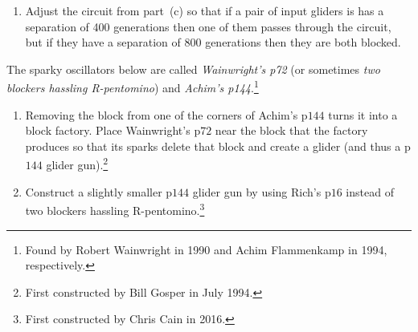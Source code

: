 \begin{multicols}{2}
\begin{problem}
\begin{enumerate}[label=\bf\color{ocre}(\alph*)]
			\item {} Adjust the circuit from part~(c) so that if a pair of input gliders is has a separation of 400 generations then one of them passes through the circuit, but if they have a separation of 800 generations then they are both blocked.
		\end{enumerate}
	\end{problem}
	
	
	\mfilbreak
	
	
	\begin{problem}\label{exer:p144_gun_from_achim} 
		The sparky oscillators below are called \emph{Wainwright's p72} (or sometimes \emph{two blockers hassling R-pentomino}) and \emph{Achim's p144}.\footnote{Found by Robert Wainwright in 1990 and Achim Flammenkamp in 1994, respectively.}
		\begin{center}
			 \quad {}
		\end{center}
		
		\begin{enumerate}[label=\bf\color{ocre}(\alph*)]
			\item Removing the block from one of the corners of Achim's p$144$ turns it into a block factory. Place Wainwright's p$72$ near the block that the factory produces so that its sparks delete that block and create a glider (and thus a p$144$ glider gun).\footnote{First constructed by Bill Gosper in July 1994.}
			
			\item Construct a slightly smaller p$144$ glider gun by using Rich's p$16$ instead of two blockers hassling R-pentomino.\footnote{First constructed by Chris Cain in 2016.}
		\end{enumerate}
	\end{problem}
	

\end{multicols}
